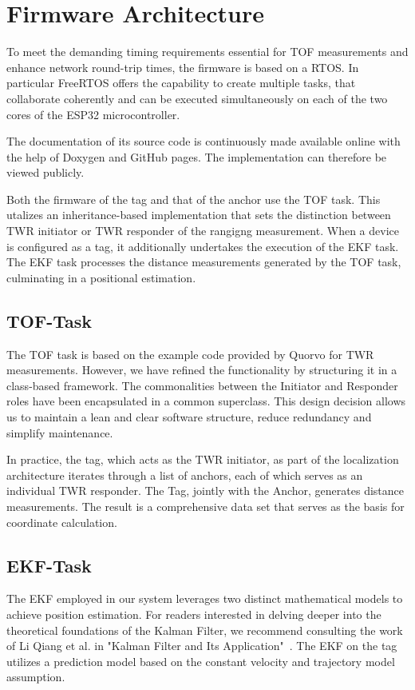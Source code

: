 \documentclass[conference, a4paper]{IEEEtran}
\begin{document}
\section{Firmware Architecture}\label{section:firmware}
To meet the demanding timing requirements essential for \ac{TOF} measurements and enhance network round-trip times,
the firmware is based on a \ac{RTOS}.
In particular FreeRTOS \cite{FreeRTOS_2023} offers the capability to create multiple tasks, that collaborate coherently and can be executed simultaneously on each of the two cores of the ESP32 microcontroller.

The documentation of its source code is continuously made available online with the help of Doxygen and GitHub pages.
The implementation can therefore be viewed publicly\cite{doxygen-doku}.

Both the firmware of the tag and that of the anchor use the \ac{TOF} task.
This utalizes an inheritance-based implementation that sets the distinction between \ac{TWR} initiator or \ac{TWR} responder of the rangigng measurement.
When a device is configured as a tag,
it additionally undertakes the execution of the \ac{EKF} task.
The \ac{EKF} task processes the distance measurements generated by the \ac{TOF} task,
culminating in a positional estimation.

\subsection{TOF-Task}\label{section:firmware-tof}
The \ac{TOF} task is based on the example code
provided by Quorvo for \ac{TWR} measurements.
However, we have refined the functionality by structuring it in a class-based framework.
The commonalities between the Initiator and Responder roles have been
encapsulated in a common superclass.
This design decision allows us to maintain a lean and clear software structure,
reduce redundancy and simplify maintenance.

In practice, the tag, which acts as the \ac{TWR} initiator, as part of the localization architecture iterates through a list of anchors, each of which serves as an individual \ac{TWR} responder. 
The Tag, jointly with the Anchor, generates distance measurements. 
The result is a comprehensive data set that serves as the basis for coordinate calculation. 

\subsection{EKF-Task}\label{section:firmware-ekf}
The \ac{EKF} employed in our system leverages two distinct mathematical models
to achieve position estimation.
For readers interested in delving deeper into the theoretical foundations of the
Kalman Filter, we recommend consulting the work of Li Qiang et al. in
"Kalman Filter and Its Application"~\cite{Kalman}.
The EKF  on the tag utilizes a prediction model based on the constant velocity and trajectory model assumption.
\end{document}
